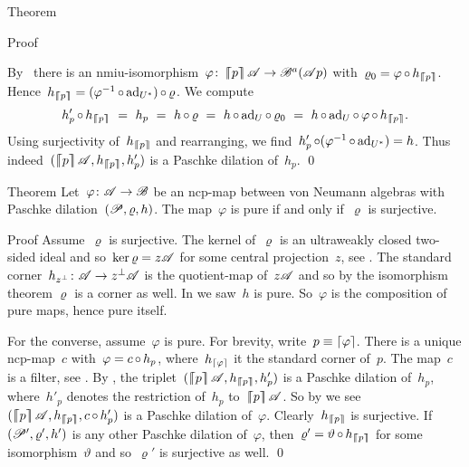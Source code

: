 \begin{parsec}
\begin{point}{Theorem}
\begin{point}{Proof}
\begin{point}
    By~
    there is an nmiu-isomorphism~$\varphi\colon
    \left\lceil\!\!\left\lceil p\right\rceil\!\!\right\rceil \mathscr{A} \to \mathscr{B}^a(\mathscr{A} p)$
    with~$\varrho_0 = \varphi \mathop{\circ} h_{\left\lceil\!\!\left\lceil p\right\rceil\!\!\right\rceil}$.
Hence~$h_{\left\lceil\!\!\left\lceil p\right\rceil\!\!\right\rceil} = (\varphi^{-1} \mathop{\circ} \mathrm{ad}_{U^*}) \mathop{\circ} \varrho$.
We compute
\begin{equation*}
h'_p \after h_{\cceil{p}}
    \ = \ h_p
    \ =\  h \after \varrho
    \ =\ h \after \ad_U \after \varrho_0
    \ = \ h \after \ad_U \after \varphi \after h_{\cceil{p}}.
\end{equation*}
Using surjectivity of~$h_{\left\lceil\!\!\left\lceil p\right\rceil\!\!\right\rceil}$
and rearranging, we find~$h'_p \mathop{\circ} (\varphi^{-1} \mathop{\circ} \mathrm{ad}_{U^*}) = h$.
Thus indeed~$(\cceil{p} \scrA, h_{\cceil{p}}, h'_p)$
is a Paschke dilation of~$h_p$.  \qed
\end{point}
\end{point}
\end{point}
\begin{point}{Theorem}%
    Let~$\varphi\colon \mathscr{A} \to \mathscr{B}$ be an ncp-map
    between von Neumann algebras with
    Paschke dilation~$(\mathscr{P}, \varrho, h)$.
The map~$\varphi$ is pure if and only if~$\varrho$ is surjective.
\begin{point}{Proof}%
Assume~$\varrho$ is surjective.
The kernel of~$\varrho$ is an ultraweakly closed
two-sided ideal and so~$\ker\varrho = z \mathscr{A}$ for some central projection~$z$,
see .
The standard corner~$h_{z^\perp} \colon \mathscr{A} \to z^\perp \mathscr{A}$
    is the quotient-map of~$z \mathscr{A}$
    and so by the isomorphism theorem $\varrho$ is a corner as well.
In  we saw~$h$ is pure.
So~$\varphi$ is the composition of pure maps, hence pure itself.

For the converse, assume~$\varphi$ is pure.
For brevity, write~$p \equiv \left\lceil\varphi\right\rceil$.
There is a unique ncp-map~$c$ with~$\varphi = c \mathop{\circ} h_p$,
    where~$h_{\left\lceil\varphi\right\rceil}$ it the standard corner of~$p$.
The map~$c$ is a filter,
    see .
By ,
    the triplet~$(\cceil{p}\scrA, h_{\cceil{p}}, h'_p)$
    is a Paschke dilation of~$h_p$,
    where~$h'_p$ denotes the restriction of~$h_p$ to~$\left\lceil\!\!\left\lceil p\right\rceil\!\!\right\rceil \mathscr{A}$.
So by 
    we see~$(\cceil{p}\scrA, h_{\cceil{p}}, c\after h'_p)$
    is a Paschke dilation of~$ \varphi$.
Clearly~$h_{\left\lceil\!\!\left\lceil p\right\rceil\!\!\right\rceil}$ is surjective.
If~$(\mathscr{P}', \varrho', h')$ is any other Paschke dilation of~$\varphi$,
    then~$\varrho' = \vartheta \mathop{\circ} h_{\left\lceil\!\!\left\lceil p\right\rceil\!\!\right\rceil}$
    for some isomorphism~$\vartheta$
    and so~$\varrho'$ is surjective as well. \qed
\end{point}
\end{point}
\end{parsec}

